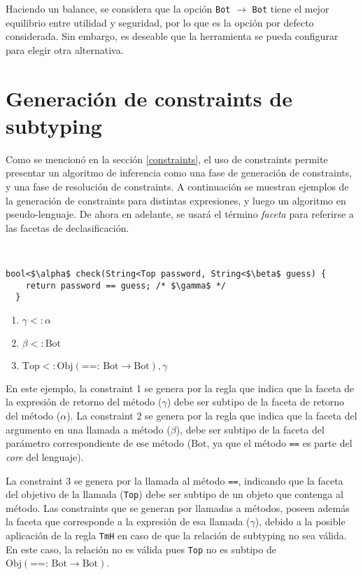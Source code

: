 Haciendo un balance, se considera que la opción \texttt{Bot} $\rightarrow$ \texttt{Bot} tiene el mejor equilibrio entre utilidad y seguridad, por lo que es la opción por defecto considerada. Sin embargo, es deseable que la herramienta se pueda configurar para elegir otra alternativa.

\section{Generación de constraints de subtyping}
Como se mencionó en la sección \ref{constraints}, el uso de constraints permite presentar un algoritmo de inferencia como una fase de generación de constraints, y una fase de resolución de constraints. A continuación se muestran ejemplos de la generación de constraints para distintas expresiones, y luego un algoritmo en pseudo-lenguaje. De ahora en adelante, se usará el término \textit{faceta} para referirse a las facetas de declasificación.

\begin{ej}\ \\
  \normalfont
  \label{gen1}
\begin{lstlisting}[mathescape=true]
  bool<$\alpha$ check(String<Top password, String<$\beta$ guess) {
    return password == guess; /* $\gamma$ */
  }
\end{lstlisting}

\begin{enumerate}
  \item $\gamma <: \alpha$
  \item $\beta <: \text{Bot}$
  \item $\text{Top} <: \text{Obj}(\text{==: }\text{Bot} \rightarrow \text{Bot}), \gamma$
\end{enumerate}
\end{ej}

En este ejemplo, la constraint 1 se genera por la regla que indica que la faceta de la expresión de retorno del método ($\gamma$) debe ser subtipo de la faceta de retorno del método ($\alpha$). La constraint 2 se genera por la regla que indica que la faceta del argumento en una llamada a método ($\beta$), debe ser subtipo de la faceta del parámetro correspondiente de ese método ($\text{Bot}$, ya que el método \texttt{==} es parte del \textit{core} del lenguaje).

La constraint 3 se genera por la llamada al método \texttt{==}, indicando que la faceta del objetivo de la llamada (\texttt{Top}) debe ser subtipo de un objeto que contenga al método. Las constraints que se generan por llamadas a métodos, poseen además la faceta que corresponde a la expresión de esa llamada ($\gamma$), debido a la posible aplicación de la regla \texttt{TmH} en caso de que la relación de subtyping no sea válida. En este caso, la relación no es válida pues \texttt{Top} no es subtipo de $\text{Obj}(\text{==: }\text{Bot} \rightarrow \text{Bot})$.

